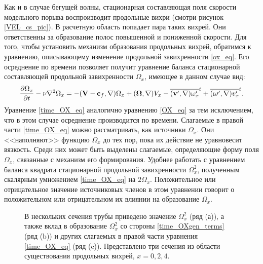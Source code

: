 Как и в случае бегущей волны, стационарная составляющая поля скорости модельного порыва воспроизводит продольные вихри (смотри рисунок \ref{VEL_cs_pic}). В расчетную область попадает пара таких вихрей. Они ответственны за образование полос повышенной и пониженной скорости. Для того, чтобы установить механизм образования продольных вихрей, обратимся к уравнению, описывающему изменение продольной завихренности \eqref{ox_eq}. Его осреднение по времени позволяет получит уравнение баланса стационарной составляющей продольной завихренности $\Omega_x$, имеющее в данном случае вид:
\begin{equation} \label{time_OX_eq}
\frac{\partial \Omega_x}{\partial t} - \nu\nabla^2 \Omega_x = - (\mathbf{V} - \mathbf{c}_f, \nabla) \Omega_x + (\mbox{\boldmath$\Omega$}, \nabla) V_x - \overline{(\mathbf{v}', \nabla) \omega'_x}^t + \overline{ (\mbox{\boldmath$\omega$}', \nabla) v'_x }^t.
\end{equation}
Уравнение \eqref{time_OX_eq} аналогично уравнению \eqref{OX_eq} за тем исключением, что в этом случае осреднение производится по времени. Слагаемые в правой части \eqref{time_OX_eq} можно рассматривать, как источники $\Omega_x$. Они <<наполняют>> функцию $\Omega_x$ до тех пор, пока их действие не уравновесит вязкость. Среди них может быть выделены слагаемые, определяющие форму поля $\Omega_x$, связанные с механизм его формирования. Удобнее работать с уравнением баланса квадрата стационарной продольной завихренности $\Omega_x^2$, полученным скалярным умножением \eqref{time_OX_eq} на $2\Omega_x$. Положительное или отрицательное значение источниковых членов в этом уравнении говорит о положительном или отрицательном их влиянии на образование $\Omega_x$. 


\begin{figure}[h]
\caption{В нескольких сечения трубы приведено значение $\Omega_x^2$ (ряд (а)), а также вклад в образование $\Omega_x^2$ со стороны \eqref{time_OXgen_terms} (ряд (b)) и других слагаемых в правой части уравнения \eqref{time_OX_eq} (ряд (c)). Представлено три сечения из области существования продольных вихрей, $x=0,2,4$.}
\label{mp_OXgen_pic}
\end{figure}

